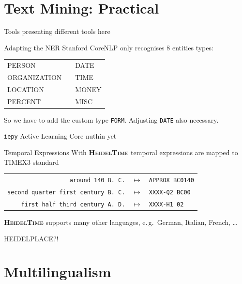 \documentclass[xcolor=x11names, aspectratio=169,usenames,dvipsnames]{beamer}
\begin{document}
\section{Text Mining: Practical}

\begin{frame}{Tools}
presenting different tools here
\end{frame}

\begin{frame}[fragile]{Adapting the NER}
Stanford CoreNLP only recognises 8 entities types:

\begin{center}\ttfamily
\begin{tabular}{lll}
PERSON&&DATE\\
ORGANIZATION&&TIME\\
LOCATION&&MONEY\\
PERCENT&&MISC
\end{tabular}
\end{center}

So we have to add the custom type \texttt{FORM}. Adjusting \texttt{DATE} also necessary.
\end{frame}

\begin{frame}[fragile]{\texttt{iepy} Active Learning Core}
nuthin yet
\end{frame}

\begin{frame}{Temporal Expressions}
With \textbf{\textsc{HeidelTime}} temporal expressions are mapped to TIMEX3 standard
\begin{center}
{\renewcommand{\arraystretch}{1.2}%
\begin{tabular}{rcl}
\texttt{around 140 B.\,C.}&$\longmapsto$&\texttt{APPROX BC0140}\\
\texttt{second quarter first century B.\,C.}&$\longmapsto$&\texttt{XXXX-Q2 BC00}\\
\texttt{first half third century A.\,D.}&$\longmapsto$&\texttt{XXXX-H1 02}\\
\end{tabular}
}
\end{center}
\pause
\textbf{\textsc{HeidelTime}} supports many other languages, e.\,g.\ German, Italian, French, \dots

HEIDELPLACE?!
\end{frame}

\section{Multilingualism}
\end{document}
